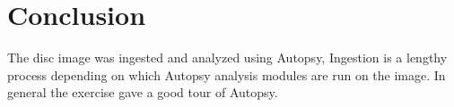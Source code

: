 \documentclass[
	letterpaper, %
	10pt, %
	unnumberedsections, %
	twoside, %
]{APAAssignment}
\begin{document}
\section{Conclusion}
The disc image was ingested and analyzed using Autopsy, Ingestion is a lengthy process depending on which Autopsy analysis modules are run on the image. In general the exercise gave a good tour of Autopsy.




\clearpage
\printbibliography %




%


\clearpage
\end{document}
